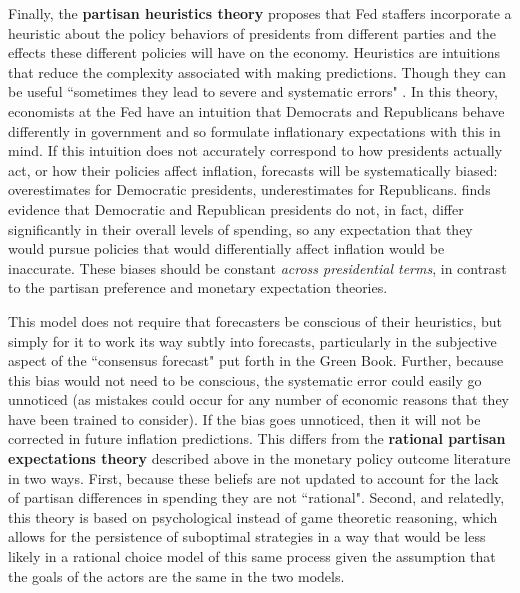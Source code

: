\documentclass[a4paper]{article}\usepackage{graphicx, color}
\begin{document}
Finally, the {\bf{partisan heuristics theory}} proposes that Fed staffers incorporate a heuristic \citep[see][]{kahneman1973, tverskykahneman1974, kahneman2003} about the policy behaviors of presidents from different parties and the effects these different policies will have on the economy. Heuristics are intuitions that reduce the complexity associated with making predictions. Though they can be useful ``sometimes they lead to severe and systematic errors" \citep[][1124]{tverskykahneman1974}. In this theory, economists at the Fed have an intuition that Democrats and Republicans behave differently in government and so formulate inflationary expectations with this in mind. If this intuition does not accurately correspond to how presidents actually act, or how their policies affect inflation, forecasts will be systematically biased: overestimates for Democratic presidents, underestimates for Republicans. \cite{Bartels2008} finds evidence that Democratic and Republican presidents do not, in fact, differ significantly in their overall levels of spending, so any expectation that they would pursue policies that would differentially affect inflation would be inaccurate. These biases should be constant {\emph{across presidential terms}}, in contrast to the partisan preference and monetary expectation theories.

This model does not require that forecasters be conscious of their heuristics, but simply for it to work its way subtly into forecasts, particularly in the subjective aspect of the ``consensus forecast" put forth in the Green Book. Further, because this bias would not need to be conscious, the systematic error could easily go unnoticed (as mistakes could occur for any number of economic reasons that they have been trained to consider). If the bias goes unnoticed, then it will not be corrected in future inflation predictions. This differs from the {\bf{rational partisan expectations theory}} described above in the monetary policy outcome literature in two ways. First, because these beliefs are not updated to account for the lack of partisan differences in spending they are not ``rational". Second, and relatedly, this theory is based on psychological instead of game theoretic reasoning, which allows for the persistence of suboptimal strategies in a way that would be less likely in a rational choice model of this same process given the assumption that the goals of the actors are the same in the two models. %
\end{document}
